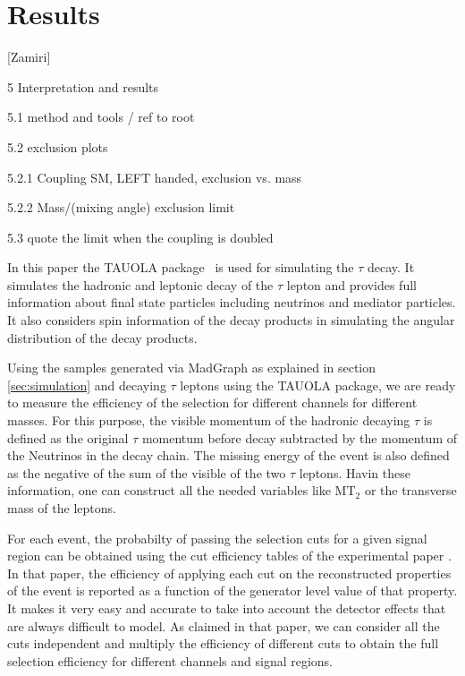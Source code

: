 \section{Results}\label{sec:results} 

[Zamiri]

5 Interpretation and results

5.1 method and tools / ref to root

5.2 exclusion plots

5.2.1 Coupling SM, LEFT handed, exclusion vs. mass

5.2.2 Mass/(mixing angle) exclusion limit

5.3 quote the limit when the coupling is doubled



In this paper the TAUOLA package~\cite{Davidson:2010rw,Jadach:1990mz,Golonka:2003xt,Jadach:1993hs} is used for simulating the $\tau$ decay. It simulates the hadronic and leptonic decay of the $\tau$ lepton and provides full information about final state particles including neutrinos and mediator particles. It also considers spin information of the decay products in simulating the angular distribution of the decay products.

Using the \wprime samples generated via MadGraph as explained in section \ref{sec:simulation} and decaying $\tau$ leptons using the TAUOLA package, we are ready to measure the efficiency of the selection for different channels for different \wprime masses. For this purpose, the visible momentum of the hadronic decaying $\tau$ is defined as the original $\tau$ momentum before decay subtracted by the momentum of the Neutrinos in the decay chain. The missing energy of the event is also defined as the negative of the sum of the visible \pt of the two $\tau$ leptons. Havin these information, one can construct all the needed variables like MT$_2$ or the transverse mass of the leptons. 

For each event, the probabilty of passing the selection cuts for a given signal region can be obtained using the cut efficiency tables of the experimental paper \cite{Khachatryan:2016trj}. In that paper, the efficiency of applying each cut on the reconstructed properties of the event is reported as a function of the generator level value of that property. It makes it very easy and accurate to take into account the detector effects that are always difficult to model. As claimed in that paper, we can consider all the cuts independent and multiply the efficiency of different cuts to obtain the full selection efficiency for different channels and signal regions.

